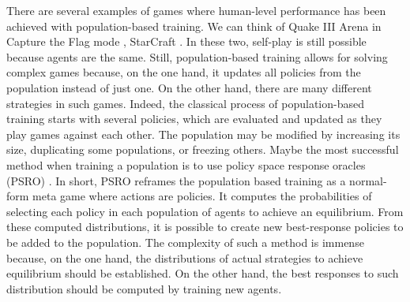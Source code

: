 There are several examples of games where human-level performance has been achieved with population-based training.
We can think of Quake III Arena in Capture the Flag mode \citep{jaderberg2019human}, StarCraft \citep{vinyals2019grandmaster}.
In these two, self-play is still possible because agents are the same.
Still, population-based training allows for solving complex games because, on the one hand, it updates all policies from the population instead of just one.
On the other hand, there are many different strategies in such games.
Indeed, the classical process of population-based training starts with several policies, which are evaluated and updated as they play games against each other.
The population may be modified by increasing its size, duplicating some populations, or freezing others.
Maybe the most successful method when training a population is to use policy space response oracles (PSRO) \citep{NIPS2017_3323fe11, Muller2020A}.
In short, PSRO reframes the population based training as a normal-form meta game where actions are policies.
It computes the probabilities of selecting each policy in each population of agents to achieve an equilibrium.
From these computed distributions, it is possible to create new best-response policies to be added to the population.
The complexity of such a method is immense because, on the one hand, the distributions of actual strategies to achieve equilibrium should be established.
On the other hand, the best responses to such distribution should be computed by training new agents.